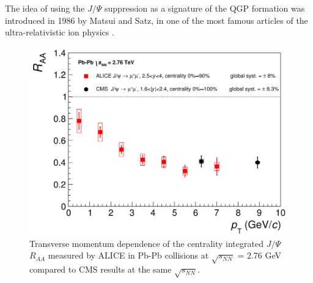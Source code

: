 The idea of using the $J/\Psi$ suppression as a signature of the QGP formation was introduced in 1986 by Matsui and Satz, in one of the most famous articles of the ultra-relativistic ion physics \cite{matsui}.\\
%
\begin{figure}
  \centering
  \includegraphics[scale=0.25]{figures/jpsi.png}
  \caption{Transverse momentum dependence of the centrality integrated $J/\Psi$ $R_{AA}$ measured by ALICE in Pb-Pb collisions at $\sqrt{s_{NN}}$ = 2.76 GeV compared to CMS results at the same $\sqrt{s_{NN}}$.}
  \label{fig:jpsi}
\end{figure}
%